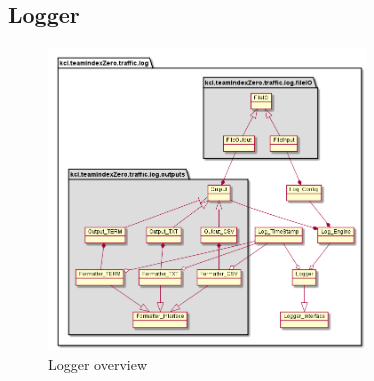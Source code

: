 \subsection{Logger}
\begin{figure}[h]
	\vspace{1.5em}
  	\caption{Logger overview}
  	\label{fig:logger_overview}
  	\centering
	\includegraphics[width=0.75\textwidth]{figs/logger/LogModuleObjectDiagram.png}
  	\vspace{1.5em}
\end{figure}

